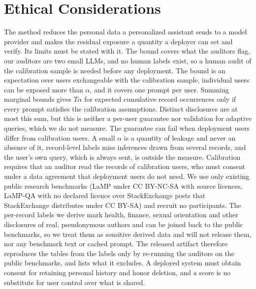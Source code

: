 \section*{Ethical Considerations}
The method reduces the personal data a personalized assistant sends to a
model provider and makes the residual exposure a quantity a deployer can set
and verify. Its limits must be stated with it. The bound covers what the
auditors flag, our auditors are two small LLMs, and no human labels exist, so
a human audit of the calibration sample is needed before any deployment. The
bound is an expectation over users exchangeable with the calibration sample,
individual users can be exposed more than $\alpha$, and it covers one prompt
per user. Summing marginal bounds gives $T\alpha$ for expected cumulative
record occurrences only if every prompt satisfies the calibration assumptions.
Distinct disclosures are at most this sum, but this is neither a per-user
guarantee nor validation for adaptive queries, which we do not measure.
The guarantee can fail when
deployment users differ from calibration users. A
small $\alpha$ is a quantity of leakage and never an absence of it,
record-level labels miss inferences drawn from several records, and the
user's own query, which is always sent, is outside the measure. Calibration
requires that an auditor read the records of calibration users, who must
consent under a data agreement that deployment users do not need. We use only
existing public research benchmarks (LaMP under CC BY-NC-SA with source
licences, LaMP-QA with no declared licence over StackExchange posts that
StackExchange distributes under CC BY-SA) and recruit no participants. The
per-record labels we derive mark health, finance, sexual orientation and
other disclosures of real, pseudonymous authors and can be joined back to the
public benchmarks, so we treat them as sensitive derived data and will not
release them, nor any benchmark text or cached prompt. The released artifact
therefore reproduces the tables from the labels only by re-running the
auditors on the public benchmarks, and lists what it excludes. A deployed system must obtain consent
for retaining personal history and honor deletion, and a score is no
substitute for user control over what is shared.
